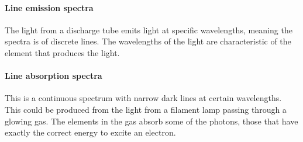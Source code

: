 \documentclass{article}[18pt]
\begin{document}
\paragraph{Line emission spectra}
The light from a discharge tube emits light at specific wavelengths, meaning the spectra is of discrete lines. The wavelengths of the light are characteristic of the element that produces the light.
\paragraph{Line absorption spectra}
This is a continuous spectrum with narrow dark lines at certain wavelengths. This could be produced from the light from a filament lamp passing through a glowing gas. The elements in the gas absorb some of the photons, those that have exactly the correct energy to excite an electron.
\end{document}
